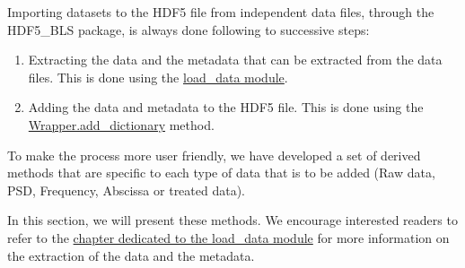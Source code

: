     
    
Importing datasets to the HDF5 file from independent data files, through the HDF5\_BLS package, is always done following to successive steps:
\begin{enumerate}
    \item Extracting the data and the metadata that can be extracted from the data files. This is done using the \hyperref[chap:load_data]{load\_data module}.
    \item Adding the data and metadata to the HDF5 file. This is done using the \hyperref[subchapter:wrapper.add_dictionary]{Wrapper.add\_dictionary} method.
\end{enumerate}

To make the process more user friendly, we have developed a set of derived methods that are specific to each type of data that is to be added (Raw data, PSD, Frequency, Abscissa or treated data). 

In this section, we will present these methods. We encourage interested readers to refer to the \hyperref[chap:load_data]{chapter dedicated to the load\_data module} for more information on the extraction of the data and the metadata.